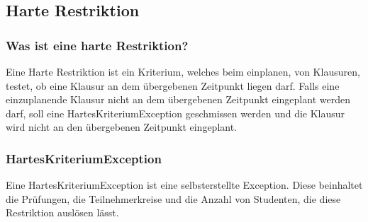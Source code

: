 \subsection{Harte Restriktion}\label{sec:Harte Restriktion}

\subsubsection{Was ist eine harte Restriktion?}
Eine Harte Restriktion ist ein Kriterium, welches beim einplanen, von Klausuren, testet,
ob eine Klausur an dem übergebenen Zeitpunkt liegen darf.
Falls eine einzuplanende Klausur nicht an dem übergebenen Zeitpunkt eingeplant werden darf,
soll eine HartesKriteriumException geschmissen werden und die Klausur wird nicht an den übergebenen
Zeitpunkt eingeplant.

\subsubsection{HartesKriteriumException}
Eine HartesKriteriumException ist eine selbsterstellte Exception.
Diese beinhaltet die Prüfungen, die Teilnehmerkreise und die Anzahl von Studenten, die diese Restriktion auslösen lässt.


